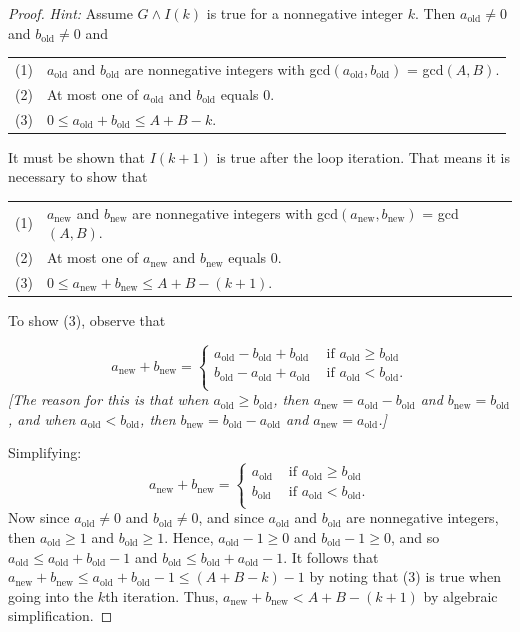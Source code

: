 \documentclass[14pt]{extarticle}
\begin{document}
\begin{proof}
{\it Hint:} Assume $G \wedge I(k)$ is true for a nonnegative integer $k$. Then $a_{\text{old}} \neq 0$ and $b_{\text{old}} \neq 0$ and 

\begin{tabular}{ll}
(1) & $a_{\text{old}}$ and $b_{\text{old}}$ are nonnegative integers with gcd$(a_{\text{old}}, b_{\text{old}})$ = gcd$(A, B)$. \\
(2) & At most one of $a_{\text{old}}$ and $b_{\text{old}}$ equals 0. \\
(3) & $0 \leq a_{\text{old}} + b_{\text{old}} \leq A + B - k$.
\end{tabular}

It must be shown that $I(k + 1)$ is true after the loop iteration. That means it is necessary to show that 

\begin{tabular}{ll}
(1) & $a_{\text{new}}$ and $b_{\text{new}}$ are nonnegative integers with gcd$(a_{\text{new}}, b_{\text{new}})$ = gcd$(A, B)$. \\
(2) & At most one of $a_{\text{new}}$ and $b_{\text{new}}$ equals 0. \\
(3) & $0 \leq a_{\text{new}} + b_{\text{new}} \leq A + B - (k + 1)$.
\end{tabular}

To show (3), observe that 

\[
a_{\text{new}} + b_{\text{new}} =
\left\{
\begin{array}{lr}
a_{\text{old}} - b_{\text{old}} + b_{\text{old}} & \text{ if } a_{\text{old}} \geq b_{\text{old}} \\
b_{\text{old}} - a_{\text{old}} + a_{\text{old}} & \text{ if } a_{\text{old}} < b_{\text{old}}. \\
\end{array}
\right.
\]
{\it [The reason for this is that when $a_{\text{old}} \geq b_{\text{old}}$, then $a_{\text{new}} = a_{\text{old}} - b_{\text{old}}$ and $b_{\text{new}} = b_{\text{old}}$, and when $a_{\text{old}} < b_{\text{old}}$, then $b_{\text{new}} = b_{\text{old}} - a_{\text{old}}$ and $a_{\text{new}} = a_{\text{old}}$.]}

Simplifying:
\[
a_{\text{new}} + b_{\text{new}} =
\left\{
\begin{array}{lr}
a_{\text{old}} & \text{ if } a_{\text{old}} \geq b_{\text{old}} \\
b_{\text{old}} & \text{ if } a_{\text{old}} < b_{\text{old}}. \\
\end{array}
\right.
\]
Now since $a_{\text{old}} \neq 0$ and $b_{\text{old}} \neq 0$, and since $a_{\text{old}}$ and $b_{\text{old}}$ are nonnegative integers, then $a_{\text{old}} \geq 1$ and $b_{\text{old}} \geq 1$. Hence, $a_{\text{old}} - 1 \geq 0$ and $b_{\text{old}} - 1 \geq 0$, and so $a_{\text{old}} \leq a_{\text{old}} + b_{\text{old}} - 1$ and $b_{\text{old}} \leq b_{\text{old}} + a_{\text{old}} - 1$. It follows that $a_{\text{new}} + b_{\text{new}} \leq a_{\text{old}} + b_{\text{old}} - 1 \leq (A + B - k) - 1$ by noting that (3) is true when going into the $k$th iteration. Thus, $a_{\text{new}} + b_{\text{new}} < A + B - (k + 1)$ by algebraic simplification.
\end{proof}
\end{document}
